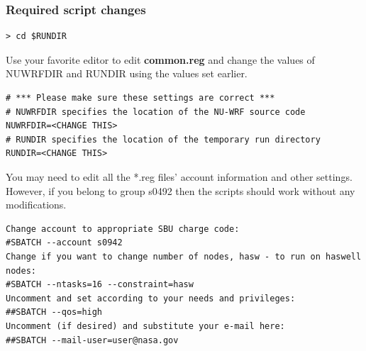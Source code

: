\begin{frame}[fragile]
\frametitle{Required script changes}
\verbatimfont{\scriptsize}%
\begin{verbatim}
> cd $RUNDIR
\end{verbatim}
Use your favorite editor to edit \textbf{common.reg} and change the values of NUWRFDIR and RUNDIR using the values set earlier.
\verbatimfont{\scriptsize}%
\begin{verbatim}
# *** Please make sure these settings are correct ***
# NUWRFDIR specifies the location of the NU-WRF source code
NUWRFDIR=<CHANGE THIS>
# RUNDIR specifies the location of the temporary run directory
RUNDIR=<CHANGE THIS>
\end{verbatim}
You may need to edit all the *.reg files' account information and other settings. However, if you belong to group s0492 then the scripts should work without any modifications.
\verbatimfont{\scriptsize}%
\begin{verbatim}
Change account to appropriate SBU charge code:
#SBATCH --account s0942 
Change if you want to change number of nodes, hasw - to run on haswell nodes:
#SBATCH --ntasks=16 --constraint=hasw
Uncomment and set according to your needs and privileges:
##SBATCH --qos=high 
Uncomment (if desired) and substitute your e-mail here:
##SBATCH --mail-user=user@nasa.gov 
\end{verbatim}

\end{frame}

